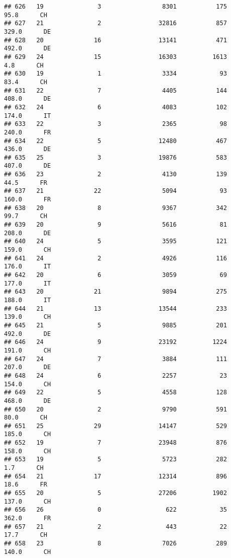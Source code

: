 \documentclass[
]{article}
\begin{document}
\begin{verbatim}
## 626   19               3                 8301           175     95.8      CH
## 627   21               2                32816           857    329.0      DE
## 628   20              16                13141           471    492.0      DE
## 629   24              15                16303          1613      4.8      CH
## 630   19               1                 3334            93     83.4      CH
## 631   22               7                 4405           144    408.0      DE
## 632   24               6                 4083           102    174.0      IT
## 633   22               3                 2365            98    240.0      FR
## 634   22               5                12480           467    436.0      DE
## 635   25               3                19876           583    407.0      DE
## 636   23               2                 4130           139     44.5      FR
## 637   21              22                 5094            93    160.0      FR
## 638   20               8                 9367           342     99.7      CH
## 639   20               9                 5616            81    208.0      DE
## 640   24               5                 3595           121    159.0      CH
## 641   24               2                 4926           116    176.0      IT
## 642   20               6                 3059            69    177.0      IT
## 643   20              21                 9894           275    188.0      IT
## 644   21              13                13544           233    139.0      CH
## 645   21               5                 9885           201    492.0      DE
## 646   24               9                23192          1224    191.0      CH
## 647   24               7                 3884           111    207.0      DE
## 648   24               6                 2257            23    154.0      CH
## 649   22               5                 4558           128    468.0      DE
## 650   20               2                 9790           591     80.0      CH
## 651   25              29                14147           529    185.0      CH
## 652   19               7                23948           876    158.0      CH
## 653   19               5                 5723           282      1.7      CH
## 654   21              17                12314           896     18.6      FR
## 655   20               5                27206          1902    137.0      CH
## 656   26               0                  622            35    362.0      FR
## 657   21               2                  443            22     17.7      CH
## 658   23               8                 7026           289    140.0      CH

\end{verbatim}
\end{document}
